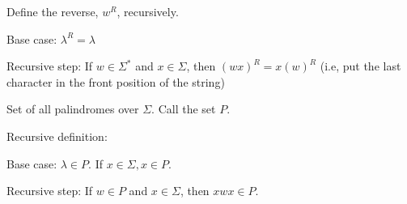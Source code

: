 \documentclass{exam}
\begin{document}
    Define the reverse, $w^R$, recursively.
    
    Base case: $\lambda^R = \lambda$
    
    Recursive step: If $w \in \Sigma^*$ and $x \in \Sigma$, then $(wx)^R = x(w)^R$ (i.e, put the last character in the front position of the string)
    
    Set of all palindromes over $\Sigma$. Call the set $P$.
    
    Recursive definition: 
    
    Base case: $\lambda \in P$. If $x \in \Sigma, x \in P$.
    
    Recursive step: If $w \in P$ and $x \in \Sigma$, then $xwx \in P$.
    
\end{document}
